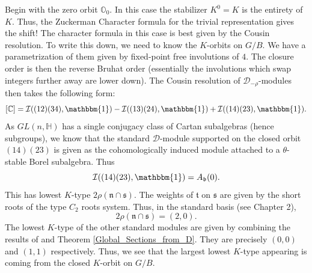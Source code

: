 \documentclass[letterpaper,twosided,11pt]{article}
\theoremstyle{plain}
\theoremstyle{definition}
\theoremstyle{remark}
\newcommand{\C}{\mathbb{C}}
\newcommand{\HH}{\mathbb{H}}
\newcommand{\OO}{\mathbb{O}}
\newcommand{\lie}[1]{\mathfrak{#1}}
\begin{document}
Begin with the zero orbit $ \OO_0. $ In this case the stabilizer $ K^0=K
$ is the entirety of $ K. $ Thus, the Zuckerman Character formula for
the trivial representation gives the shift!  The character formula in
this case is best given by the Cousin resolution.  To write this down,
we need to know the $ K $-orbits on $ G/B. $ We have a parametrization
of them
\cite{RichardsonSpringer1990} given by fixed-point free involutions of $
4. $ The closure order is then the reverse Bruhat order (essentially the
involutions which swap integers further away are lower down).  The
Cousin resolution of $ \mathcal{D}_{-\rho} $-modules then takes the
following form:
\[
    [\C]=\mathcal{I}((12)(34),\mathbbm{1})-\mathcal{I}((13)(24),\mathbbm
    {1})+\mathcal{I}((14)(23),\mathbbm{1}).
\]
As $ GL(n,\HH) $ has a single conjugacy class of Cartan subalgebras (hence
subgroups), we know that the standard $ \mathcal{D} $-module supported
on the closed orbit $ (14)(23) $ is given as the cohomologically induced
module attached to a $ \theta $-stable Borel subalgebra.  Thus
\[
    \mathcal{I}((14)(23),\mathbbm{1})=A_\lie{b}(0).
\]
This has lowest $ K $-type $ 2\rho(\lie{n}\cap\lie{s}). $ The weights of
$ \lie{t} $ on $ \lie{s} $ are given by the short roots of the type $ C_2
$ roots system.  Thus, in the standard basis (see \cite{Knapp2005} Chapter 2), 
\[
    2\rho(\lie{n}\cap \lie{s})=(2,0).
\]
The lowest $ K $-type of the other standard modules are given by
combining the results of
\cite{Primc1979} and Theorem \ref{Global_Sections_from_D}.  They are
precisely $ (0,0) $ and $ (1,1) $ respectively.  Thus, we see that the
largest lowest $ K $-type appearing is coming from the closed $ K $-orbit
on $ G/B. $
\end{document}
